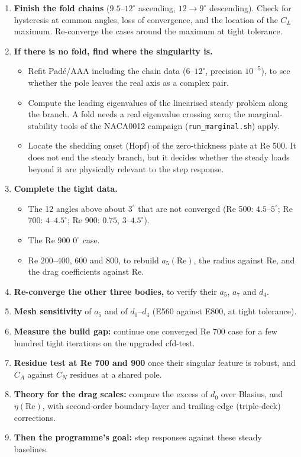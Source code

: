 \documentclass[11pt,a4paper]{article}
\newcommand{\CL}{C_L}
\newcommand{\CN}{C_N}
\newcommand{\CA}{C_A}
\begin{document}
\begin{enumerate}[leftmargin=*]
\item \textbf{Finish the fold chains} ($9.5$--$12^\circ$ ascending, $12\to9^\circ$ descending). Check for
  hysteresis at common angles, loss of convergence, and the location of the $\CL$ maximum. Re-converge
  the cases around the maximum at tight tolerance.
\item \textbf{If there is no fold, find where the singularity is.}
  \begin{itemize}
  \item Refit Padé/AAA including the chain data ($6$--$12^\circ$, precision $10^{-5}$), to see whether the
    pole leaves the real axis as a complex pair.
  \item Compute the leading eigenvalues of the linearised steady problem along the branch. A fold needs a
    real eigenvalue crossing zero; the marginal-stability tools of the NACA0012 campaign
    (\texttt{run\_marginal.sh}) apply.
  \item Locate the shedding onset (Hopf) of the zero-thickness plate at Re 500. It does not end the
    steady branch, but it decides whether the steady loads beyond it are physically relevant to the
    step response.
  \end{itemize}
\item \textbf{Complete the tight data.}
  \begin{itemize}
  \item The 12 angles above about $3^\circ$ that are not converged (Re 500: $4.5$--$5^\circ$; Re 700:
    $4$--$4.5^\circ$; Re 900: $0.75$, $3$--$4.5^\circ$).
  \item The Re 900 $0^\circ$ case.
  \item Re 200--400, 600 and 800, to rebuild $a_5(\mathrm{Re})$, the radius against Re, and the drag
    coefficients against Re.
  \end{itemize}
\item \textbf{Re-converge the other three bodies,} to verify their $a_5$, $a_7$ and $d_4$.
\item \textbf{Mesh sensitivity} of $a_5$ and of $d_0$--$d_4$ (E560 against E800, at tight tolerance).
\item \textbf{Measure the build gap:} continue one converged Re 700 case for a few hundred tight iterations
  on the upgraded cfd-test.
\item \textbf{Residue test at Re 700 and 900} once their singular feature is robust, and $\CA$ against $\CN$
  residues at a shared pole.
\item \textbf{Theory for the drag scales:} compare the excess of $d_0$ over Blasius, and $\eta(\mathrm{Re})$,
  with second-order boundary-layer and trailing-edge (triple-deck) corrections.
\item \textbf{Then the programme's goal:} step responses against these steady baselines.
\end{enumerate}
\end{document}
